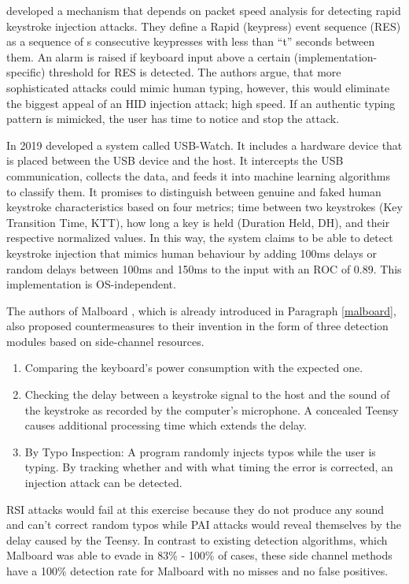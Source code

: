 \cite{neunerUSBlockBlockingUSBBased2018} developed a mechanism that depends on packet speed analysis for detecting rapid keystroke injection attacks. They define a Rapid (keypress) event sequence (RES) as a sequence of s consecutive keypresses with less than ``t'' seconds between them. An alarm is raised if keyboard input above a certain (implementation-specific) threshold for RES is detected. The authors argue, that more sophisticated attacks could mimic human typing, however, this would eliminate the biggest appeal of an HID injection attack; high speed. If an authentic typing pattern is mimicked, the user has time to notice and stop the attack.

In 2019 \cite{denneyUSBWatchDynamicHardwareAssisted2019} developed a system called USB-Watch. It includes a hardware device that is placed between the USB device and the host. It intercepts the USB communication, collects the data, and feeds it into machine learning algorithms to classify them. It promises to distinguish between genuine and faked human keystroke characteristics based on four metrics; time between two keystrokes (Key Transition Time, KTT), how long a key is held (Duration Held, DH), and their respective normalized values. In this way, the system claims to be able to detect keystroke injection that mimics human behaviour by adding 100ms delays or random delays between 100ms and 150ms to the input with an ROC of 0.89. This implementation is OS-independent.


The authors of Malboard \cite{farhiMalboardNovelUser2019}, which is already introduced in Paragraph \ref{malboard}, also proposed countermeasures to their invention in the form of three detection modules based on side-channel resources. 
\begin{enumerate}
    \item Comparing the keyboard's power consumption with the expected one.
    \item Checking the delay between a keystroke signal to the host and the sound of the keystroke as recorded by the computer's microphone. A concealed Teensy causes additional processing time which extends the delay.
    \item By Typo Inspection: A program randomly injects typos while the user is typing. By tracking whether and with what timing the error is corrected, an injection attack can be detected.
\end{enumerate}
RSI attacks would fail at this exercise because they do not produce any sound and can't correct random typos while PAI attacks would reveal themselves by the delay caused by the Teensy.   
In contrast to existing detection algorithms, which Malboard was able to evade in 83\% - 100\% of cases, these side channel methods have a 100\%  detection rate for Malboard with no misses and no false positives.  


